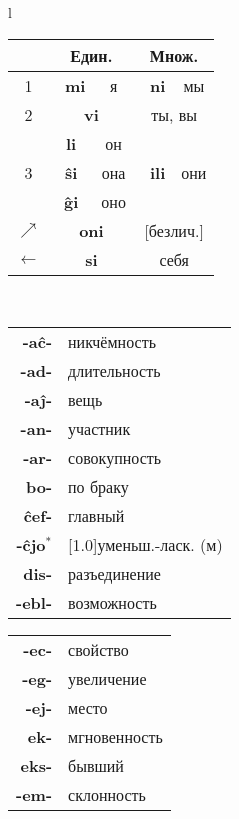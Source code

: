 \documentclass{article}
\def\b#1{\textbf{#1}}
\def\g{\cellcolor{gray!25}}
\begin{document}
\begin{center}
\begin{tabular}{l}
\begin{tabular}{|c|cc|cc|}
\hline
\g & \multicolumn{2}{c|}{\g Един.} & \multicolumn{2}{c|}{\g Множ.} \\
\hline
\g 1 & ~\b{mi}\hspace{-0.5em} & я & ~\b{ni} & мы \\
\hline
\g 2 & \multicolumn{2}{c}{\b{vi}} & \multicolumn{2}{c|}{ты, вы} \\
\hline
\g & \b{li} & он & & \\
\cline{2-3}
\g 3 & \b{ŝi} & она & ~\b{ili} & они \\
\cline{2-3}
\g & \b{ĝi} & оно & & \\	 
\hline
\g $\nearrow$ & \multicolumn{2}{c}{\b{oni}} & \multicolumn{2}{c|}{[безлич.]} \\
\hline
\g $\leftarrow$ & \multicolumn{2}{c}{\b{si}} & \multicolumn{2}{c|}{себя} \\
\hline
\end{tabular}\,
\begin{tabular}{>{\bfseries}rl}
-aĉ- & никчёмность \\
-ad- & длительность \\
-aĵ- & вещь \\
-an- & участник \\
-ar- & совокупность \\
bo- & по браку \\
ĉef- & главный \\
-ĉjo$^*$ & \scalebox{.75}[1.0]{уменьш.-ласк. (м)} \\
dis- & разъединение \\
-ebl- & возможность \\
\end{tabular}
\hspace{-0.75em}
\begin{tabular}{>{\bfseries}rl}
-ec- & свойство \\
-eg- & увеличение \\
-ej- & место \\
ek- & мгновенность \\
eks- & бывший \\
-em- & склонность \\

\end{tabular}
\end{tabular}
\end{center}
\end{document}
